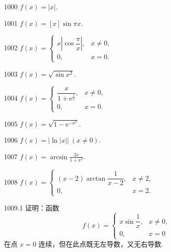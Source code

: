 \begin{prob}[S]{1000}
$f(x) = |x|$.
\end{prob}

\begin{prob}[S]{1001}
$f(x) = [x] \sin \pi x$.
\end{prob}

\begin{prob}[M]{1002}
$f(x) = \begin{cases}
x \left|\cos \dfrac{\pi}{x}\right|, & x \neq 0, \\
0, & x = 0.
\end{cases}$
\end{prob}

\begin{prob}[S]{1003}
$f(x) = \sqrt{\sin x^2}$.
\end{prob}

\begin{prob}[M]{1004}
$f(x) = \begin{cases}
\dfrac{x}{1 + \mathrm{e}^{\frac{1}{x}}}, & x \neq 0, \\
0, & x = 0.
\end{cases}$
\end{prob}

\begin{prob}[S]{1005}
$f(x) = \sqrt{1 - \mathrm{e}^{-x^2}}$.
\end{prob}

\begin{prob}[S]{1006}
$f(x) = |\ln|x|| \ (x \neq 0)$.
\end{prob}

\begin{prob}[S]{1007}
$f(x) = \arcsin \frac{2x}{1 + x^2}$.
\end{prob}

\begin{prob}[M]{1008}
$f(x) = \begin{cases}
(x - 2)\arctan \dfrac{1}{x - 2}, & x \neq 2, \\
0, & x = 2.
\end{cases}$
\end{prob}

\begin{prob}[M]{1009.1}
证明：函数
\[
f(x) = \begin{cases}
x \sin \dfrac{1}{x}, & x \neq 0, \\
0, & x = 0
\end{cases}
\]
在点 $x = 0$ 连续，但在此点既无左导数，又无右导数.
\end{prob}

